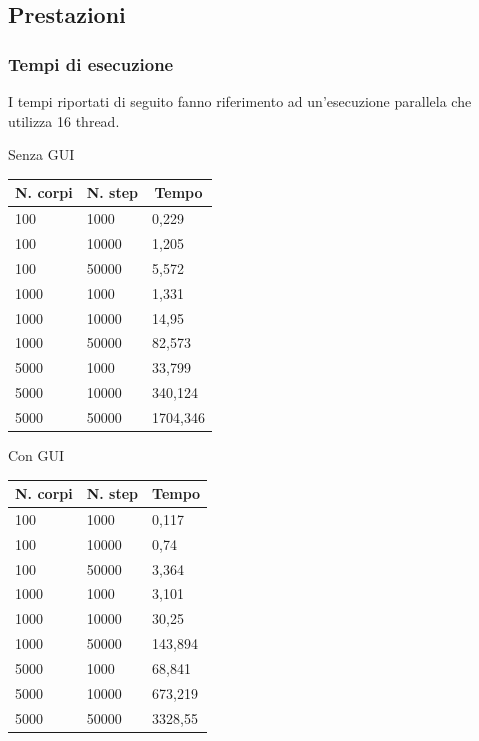 \documentclass[12pt,a4paper,oneside]{article}
\begin{document}
	\subsection{Prestazioni}
	\subsubsection{Tempi di esecuzione}
	I tempi riportati di seguito fanno riferimento ad un'esecuzione parallela che utilizza 16 thread.
	
	\hfill
	\begin{minipage}{.4\textwidth}
		Senza GUI
		
		\begin{tabular}{|l|l|l|}
			\hline
			\multicolumn{1}{|c|}{\textbf{N. corpi}} & \multicolumn{1}{c|}{\textbf{N. step}} & \multicolumn{1}{c|}{\textbf{Tempo}} \\ \hline
			100 & 1000 & 0,229 \\ \hline
			100 & 10000 & 1,205 \\ \hline
			100 & 50000 & 5,572 \\ \hline
			1000 & 1000 & 1,331 \\ \hline
			1000 & 10000 & 14,95 \\ \hline
			1000 & 50000 & 82,573 \\ \hline
			5000 & 1000 & 33,799 \\ \hline
			5000 & 10000 & 340,124 \\ \hline
			5000 & 50000 & 1704,346 \\ \hline
		\end{tabular}
	\end{minipage}
	\hfill
	\begin{minipage}{.4\textwidth}
		Con GUI
		
		\begin{tabular}{|l|l|l|}
			\hline
			\multicolumn{1}{|c|}{\textbf{N. corpi}} & \multicolumn{1}{c|}{\textbf{N. step}} & \multicolumn{1}{c|}{\textbf{Tempo}} \\ \hline
			100 & 1000 & 0,117 \\ \hline
			100 & 10000 & 0,74 \\ \hline
			100 & 50000 & 3,364 \\ \hline
			1000 & 1000 & 3,101 \\ \hline
			1000 & 10000 & 30,25 \\ \hline
			1000 & 50000 & 143,894 \\ \hline
			5000 & 1000 & 68,841 \\ \hline
			5000 & 10000 & 673,219 \\ \hline
			5000 & 50000 & 3328,55 \\ \hline
		\end{tabular}
	\end{minipage}
	\hfill
\end{document}
